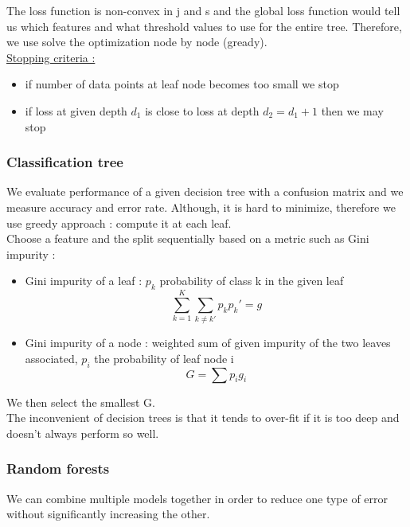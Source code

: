 \documentclass[../main.tex]{subfiles}
\begin{document}
The loss function is non-convex in j and s and the global loss function would tell us which features and what threshold values to use for the entire tree. Therefore, we use solve the optimization node by node (gready).\\

\quad \underline{Stopping criteria :}\\
\begin{itemize}
    \item if number of data points at leaf node becomes too small we stop\\
    \item if loss at given depth $d_1$ is close to loss at depth $d_2 = d_1+1$ then we may stop\\
\end{itemize}

\subsubsection{Classification tree}
We evaluate performance of a given decision tree with a confusion matrix and we measure accuracy and error rate. Although, it is hard to minimize, therefore we use greedy approach : compute it at each leaf.\\

Choose a feature and the split sequentially based on a metric such as Gini impurity : \begin{itemize}
    \item Gini impurity of a leaf : $p_k$ probability of class k in the given leaf \begin{equation}
        \sum_{k=1}^K \sum_{k\neq k'}p_kp_k' = g
    \end{equation}
    \item Gini impurity of a node : weighted sum of given impurity of the two leaves associated, $p_i$ the probability of leaf node i \begin{equation}
        G = \sum p_i g_i
    \end{equation}
\end{itemize}
We then select the smallest G.\\

The inconvenient of decision trees is that it tends to over-fit if it is too deep and doesn't always perform so well.\\

\subsubsection{Random forests}
We can combine multiple models together in order to reduce one type of error without significantly increasing the other.\\
\end{document}
